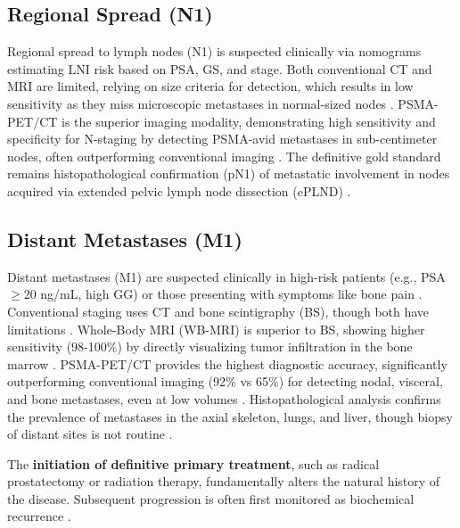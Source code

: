 \documentclass[11pt, a4paper]{article}
\begin{document}
\subsection{Regional Spread (N1)}
Regional spread to lymph nodes (N1) is suspected clinically via nomograms estimating LNI risk based on PSA, GS, and stage. Both conventional CT and MRI are limited, relying on size criteria  for detection, which results in low sensitivity as they miss microscopic metastases in normal-sized nodes \cite{RenYuan2015,SankineniBrown2015}. PSMA-PET/CT is the superior imaging modality, demonstrating high sensitivity and specificity for N-staging by detecting PSMA-avid metastases in sub-centimeter nodes, often outperforming conventional imaging \cite{LiuSandhu2025,KumarLawrentschuk2020,AmalachandranSivathapandi2024}. The definitive gold standard remains histopathological confirmation (pN1) of metastatic involvement in nodes acquired via extended pelvic lymph node dissection (ePLND) \cite{SchilhamKstersVandevelde2022}.

\subsection{Distant Metastases (M1)}
Distant metastases (M1) are suspected clinically in high-risk patients (e.g., PSA $\geq$20 ng/mL, high GG) or those presenting with symptoms like bone pain \cite{BodarLuining2023,MohseniniaZamaniSiahkali2024}. Conventional staging uses CT and bone scintigraphy (BS), though both have limitations \cite{StenmanAbrahamsson2022}. Whole-Body MRI (WB-MRI) is superior to BS, showing higher sensitivity (98-100\%) by directly visualizing tumor infiltration in the bone marrow \cite{VargasSchorBardach2016}. PSMA-PET/CT provides the highest diagnostic accuracy, significantly outperforming conventional imaging (92\% vs 65\%) for detecting nodal, visceral, and bone metastases, even at low volumes \cite{AmalachandranSivathapandi2024,LuiningMeijer2021}. Histopathological analysis confirms the prevalence of metastases in the axial skeleton, lungs, and liver, though biopsy of distant sites is not routine \cite{PasoglouMichoux2016,BangAhn2025}.


The \textbf{initiation of definitive primary treatment}, such as radical prostatectomy or radiation therapy, fundamentally alters the natural history of the disease. Subsequent progression is often first monitored as biochemical recurrence \cite{AmalachandranSivathapandi2024}.
\end{document}

